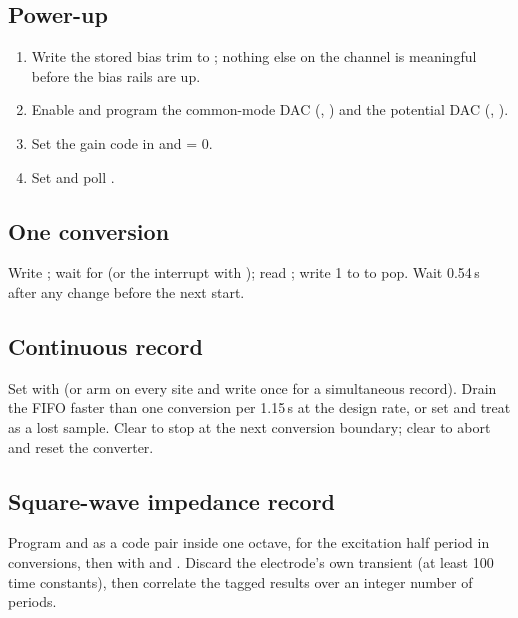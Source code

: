\subsection{Power-up}

\begin{enumerate}
	\item Write the stored bias trim to ; nothing else on the channel is meaningful before the bias rails are up.
	\item Enable and program the common-mode DAC (, ) and the potential DAC (, ).
	\item Set the gain code in  and  = 0.
	\item Set  and poll .
\end{enumerate}

\subsection{One conversion}

Write ; wait for  (or the interrupt with ); read ; write 1 to  to pop. Wait 0.54\,\textmu s after any  change before the next start.

\subsection{Continuous record}

Set  with  (or arm  on every site and write  once for a simultaneous record). Drain the FIFO faster than one conversion per 1.15\,\textmu s at the design rate, or set  and treat  as a lost sample. Clear  to stop at the next conversion boundary; clear  to abort and reset the converter.

\subsection{Square-wave impedance record}

Program  and  as a code pair inside one octave,  for the excitation half period in conversions, then  with  and . Discard the electrode's own transient (at least 100 time constants), then correlate the tagged results over an integer number of periods.

